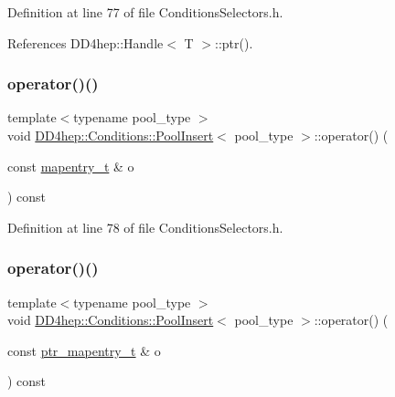 Definition at line 77 of file Conditions\+Selectors.\+h.



References D\+D4hep\+::\+Handle$<$ T $>$\+::ptr().

\hypertarget{class_d_d4hep_1_1_conditions_1_1_pool_insert_a9b2028fd086dcfc07aaa624513a7677a}{}\label{class_d_d4hep_1_1_conditions_1_1_pool_insert_a9b2028fd086dcfc07aaa624513a7677a} 
\subsubsection{\texorpdfstring{operator()()}{operator()()}\hspace{0.1cm}{\footnotesize\ttfamily [3/4]}}
{\footnotesize\ttfamily template$<$typename pool\+\_\+type $>$ \\
void \hyperlink{class_d_d4hep_1_1_conditions_1_1_pool_insert}{D\+D4hep\+::\+Conditions\+::\+Pool\+Insert}$<$ pool\+\_\+type $>$\+::operator() (\begin{DoxyParamCaption}\item[{const \hyperlink{class_d_d4hep_1_1_conditions_1_1_cond_____oper_a877dac3da66795207aed15be219acbdc}{mapentry\+\_\+t} \&}]{o }\end{DoxyParamCaption}) const\hspace{0.3cm}{\ttfamily [inline]}}



Definition at line 78 of file Conditions\+Selectors.\+h.

\hypertarget{class_d_d4hep_1_1_conditions_1_1_pool_insert_afd155c5fd755b7b645087ff1d211636b}{}\label{class_d_d4hep_1_1_conditions_1_1_pool_insert_afd155c5fd755b7b645087ff1d211636b} 
\subsubsection{\texorpdfstring{operator()()}{operator()()}\hspace{0.1cm}{\footnotesize\ttfamily [4/4]}}
{\footnotesize\ttfamily template$<$typename pool\+\_\+type $>$ \\
void \hyperlink{class_d_d4hep_1_1_conditions_1_1_pool_insert}{D\+D4hep\+::\+Conditions\+::\+Pool\+Insert}$<$ pool\+\_\+type $>$\+::operator() (\begin{DoxyParamCaption}\item[{const \hyperlink{class_d_d4hep_1_1_conditions_1_1_cond_____oper_a0949e4bd5f90cd3fae2394cf30983973}{ptr\+\_\+mapentry\+\_\+t} \&}]{o }\end{DoxyParamCaption}) const\hspace{0.3cm}{\ttfamily [inline]}}



